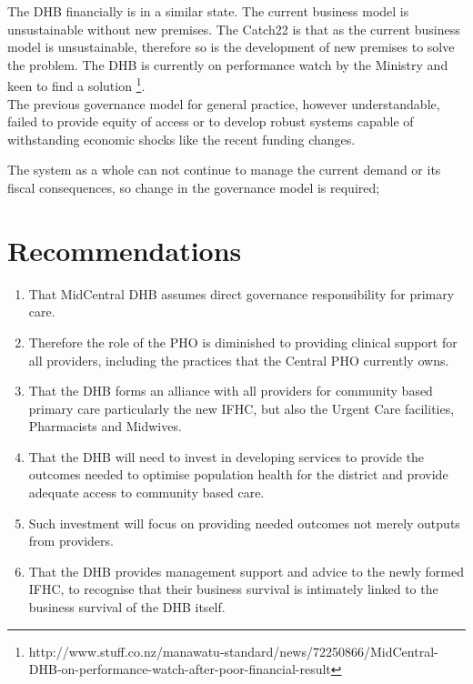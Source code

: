 \documentclass[11pt,a4paper]{article}
\begin{document}
The DHB financially is in a similar state. The current business model is unsustainable without new premises. The Catch22 is that as the current business model is unsustainable, therefore so is the development of new premises to solve the problem. The DHB is currently on performance watch by the Ministry and keen to find a solution \footnote{http://www.stuff.co.nz/manawatu-standard/news/72250866/MidCentral-DHB-on-performance-watch-after-poor-financial-result}. \\

The previous governance model for general practice, however understandable, failed to provide equity of access or to develop robust systems capable of withstanding economic shocks like the recent funding changes.

The system as a whole can not continue to manage the current demand or its fiscal consequences, so change in the governance model is required;

\section{Recommendations}
 
\begin{enumerate}
\item That MidCentral DHB assumes direct governance responsibility for primary care.
\item Therefore the role of the PHO is diminished to providing clinical support for all providers, including the practices that the Central PHO currently owns.
\item That the DHB forms an alliance with all providers for community based primary care particularly the new IFHC, but also the Urgent Care facilities, Pharmacists and Midwives.
\item That the DHB will need to invest in developing services to provide the outcomes needed to optimise population health for the district and provide adequate access to community based care. 
\item Such investment will focus on providing needed outcomes not merely outputs from providers.
\item That the DHB provides management support and advice to the newly formed IFHC, to recognise that their business survival is intimately linked to the business survival of the DHB itself. 
\end{enumerate}


\pagebreak


\end{document}
